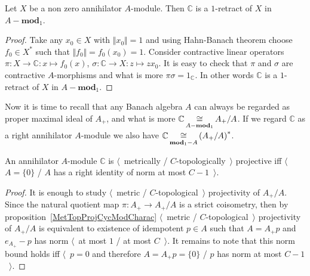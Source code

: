 \begin{proposition}\label{AnnihCModIsRetAnnihMod} Let $X$ be a non zero
annihilator $A$-module. Then $\mathbb{C}$ is a $1$-retract of $X$ in
$A-\mathbf{mod}_1$.
\end{proposition}
\begin{proof} Take any $x_0\in X$ with $\Vert x_0\Vert=1$ and using Hahn-Banach
theorem choose $f_0\in X^*$ such that $\Vert f_0\Vert=f_0(x_0)=1$. Consider
contractive linear operators $\pi:X\to \mathbb{C}:x\mapsto f_0(x)$,
$\sigma:\mathbb{C}\to X:z\mapsto zx_0$. It is easy to check that $\pi$ and
$\sigma$ are contractive $A$-morphisms and what is more
$\pi\sigma=1_\mathbb{C}$. In other words $\mathbb{C}$ is a $1$-retract of $X$ in
$A-\mathbf{mod}_1$.
\end{proof}

Now it is time to recall that any Banach algebra $A$ can always be regarded as
proper maximal ideal of $A_+$, and what is more
$\mathbb{C}\mathop{\mathbin{\cong}}\limits_{A-\mathbf{mod}_1} A_+/A$. If we regard $\mathbb{C}$ as a right
annihilator $A$-module we also have
$\mathbb{C}\mathop{\mathbin{\cong}}\limits_{\mathbf{mod}_1-A}{(A_+/A)}^*$. 

\begin{proposition}\label{MetTopProjModCCharac} An annihilator $A$-module
$\mathbb{C}$ is $\langle$~metrically / $C$-topologically~$\rangle$ projective
iff $\langle$~$A= \{0 \}$ / $A$ has a right identity of norm at most
$C-1$~$\rangle$.
\end{proposition}
\begin{proof} 
It is enough to study $\langle$~metric / $C$-topological~$\rangle$ projectivity
of $A_+/A$. Since the natural quotient map $\pi:A_+\to A_+/A$ is a strict
coisometry, then by proposition~\ref{MetTopProjCycModCharac} $\langle$~metric /
$C$-topological~$\rangle$ projectivity of $A_+/A$ is equivalent to existence of
idempotent $p\in A$ such that $A=A_+p$ and $e_{A_+}-p$ has norm $\langle$~at
most $1$ / at most $C$~$\rangle$. It remains to note that this norm bound holds
iff $\langle$~$p=0$ and therefore $A=A_+p= \{0 \}$ / $p$ has norm at most
$C-1$~$\rangle$.
\end{proof}

